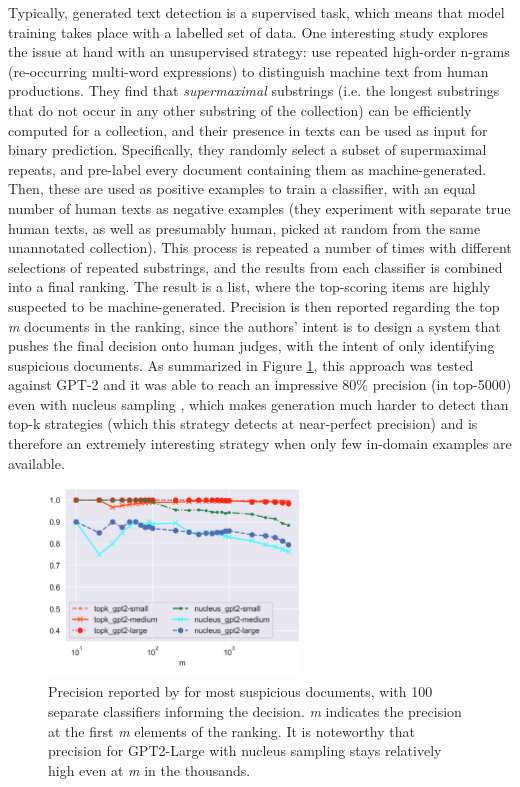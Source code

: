 Typically, generated text detection is a supervised task, which means that model training takes place with a labelled set of data.
One interesting study explores the issue at hand with an unsupervised strategy: \citet{galle2021unsupervised} use repeated high-order n-grams (re-occurring multi-word expressions) to distinguish machine text from human productions.
They find that \emph{supermaximal} substrings (i.e. the longest substrings that do not occur in any other substring of the collection) can be efficiently computed for a collection, and their presence in texts can be used as input for binary prediction.
Specifically, they randomly select a subset of supermaximal repeats, and pre-label every document containing them as machine-generated. Then, these are used as positive examples to train a classifier, with an equal number of human texts as negative examples (they experiment with separate true human texts, as well as presumably human, picked at random from the same unannotated collection).
This process is repeated a number of times with different selections of repeated substrings, and the results from each classifier is combined into a final ranking.
The result is a list, where the top-scoring items are highly suspected to be machine-generated.
Precision is then reported regarding the top \emph{m} documents in the ranking, since the authors' intent is to design a system that pushes the final decision onto human judges, with the intent of only identifying suspicious documents.
As summarized in Figure \ref{fig:galle2021_fig5_100models}, this approach was tested against GPT-2 and it was able to reach an impressive 80\% precision (in top-5000) even with nucleus sampling \citep{holtzman2019curious}, which makes generation much harder to detect than top-k strategies (which this strategy detects at near-perfect precision) and is therefore an extremely interesting strategy when only few in-domain examples are available.

\begin{figure}[ht]
    \centering
    \includegraphics[width=0.6\textwidth]{assets/galle2021_fig5_100models.png}
    \caption{
        Precision reported by \citet{galle2021unsupervised} for most suspicious documents, with 100 separate classifiers informing the decision.
        \emph{m} indicates the precision at the first \emph{m} elements of the ranking.
        It is noteworthy that precision for GPT2-Large with nucleus sampling stays relatively high even at \emph{m} in the thousands.
    }
    \label{fig:galle2021_fig5_100models}
\end{figure}

